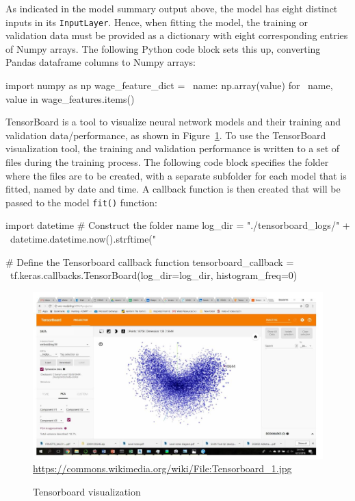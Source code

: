 As indicated in the model summary output above, the model has eight distinct inputs in its \texttt{InputLayer}. Hence, when fitting the model, the training or validation data must be provided as a dictionary with eight corresponding entries of Numpy arrays. The following Python code block sets this up, converting Pandas dataframe columns to Numpy arrays:

\begin{samepage}
\begin{pythoncode}
import numpy as np
wage_feature_dict = \
    {name: np.array(value) for \
        name, value in wage_features.items()}
\end{pythoncode}
\end{samepage}

TensorBoard is a tool to visualize neural network models and their training and validation data/performance, as shown in Figure~\ref{fig:tensorboard}. To use the TensorBoard visualization tool, the training and validation performance is written to a set of files during the training process. The following code block specifies the folder where the files are to be created, with a separate subfolder for each model that is fitted, named by date and time. A callback function is then created that will be passed to the model \texttt{fit()} function:

\begin{samepage}
\begin{pythoncode}
import datetime
# Construct the folder name
log_dir = "./tensorboard_logs/" + \
    datetime.datetime.now().strftime("%
    
# Define the Tensorboard callback function
tensorboard_callback = \
    tf.keras.callbacks.TensorBoard(log_dir=log_dir, histogram_freq=0)
\end{pythoncode}
\end{samepage}

\begin{figure}
\centering
\includegraphics[width=.9\textwidth]{Tensorboard_1.jpg} \\

\scriptsize \url{https://commons.wikimedia.org/wiki/File:Tensorboard_1.jpg}
\caption{Tensorboard visualization}
\label{fig:tensorboard}
\end{figure}

